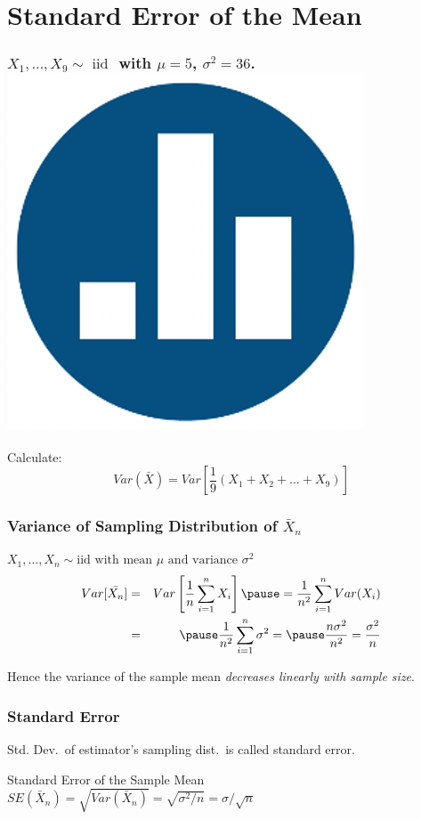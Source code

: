 \documentclass[handout]{beamer}
\begin{document}
\section{Standard Error of the Mean}
\begin{frame}
\frametitle{$X_1,\hdots, X_{9} \sim \mbox{ iid }$ with $\mu=5$, $\sigma^2 = 36$. \hfill\includegraphics[scale = 0.05]{./images/clicker}}

\large Calculate:
	 $$Var(\bar{X}) = Var\left[\frac{1}{9}(X_1 + X_2 + \hdots + X_{9})\right]$$
\end{frame}

\begin{frame}
\frametitle{Variance of Sampling Distribution of $\bar{X}_n$}
\alert{$X_1, \hdots, X_n \sim \mbox{iid with mean }\mu \mbox{ and variance } \sigma^2$}
\begin{eqnarray*}
Var[\bar{X_n}] &=& Var\left[ \frac{1}{n}\sum_{i=1}^n X_i \right] \pause= \frac{1}{n^2} \sum_{i=1}^n Var(X_i) \\
&=& \pause \frac{1}{n^2} \sum_{i=1}^n \sigma^2 = \pause \frac{n\sigma^2}{n^2} =  \frac{\sigma^2}{n}
\end{eqnarray*}

\alert{Hence the variance of the sample mean \emph{decreases linearly with sample size}.}
\end{frame}
\begin{frame}
\frametitle{Standard Error}
Std. Dev.\ of estimator's sampling dist.\ is called \alert{standard error}.
\begin{block}{Standard Error of the Sample Mean}
$SE(\bar{X}_n)= \sqrt{Var\left(\bar{X}_n\right)}= \sqrt{\sigma^2/n}=\sigma/\sqrt{n}$
\end{block}
\end{frame}
\end{document}
